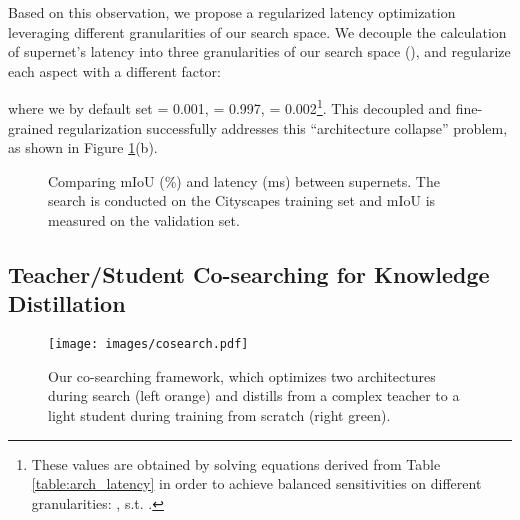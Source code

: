 \documentclass{article} \usepackage{iclr2020_conference,times}
\begin{document}
Based on this observation, we propose a regularized latency optimization leveraging different granularities of our search space. We decouple the calculation of supernet's latency into three granularities of our search space (), and regularize each aspect with a different factor:

where we by default set  = 0.001,  = 0.997,  = 0.002\footnote{These values are obtained by solving equations derived from Table \ref{table:arch_latency} in order to achieve balanced sensitivities on different granularities: , s.t. .}. This decoupled and fine-grained regularization successfully addresses this ``architecture collapse'' problem, as shown in Figure \ref{fig:search_curve}(b).


\begin{figure}[ht]
\vspace{-1em}
\begin{center}
\hfill
{} 
\vspace{-0.5em}
\caption{Comparing mIoU (\%) and latency (ms)  between supernets. The search is conducted on the Cityscapes training set and mIoU is measured on the validation set.}
\vspace{-1em}
\label{fig:search_curve}
\end{center}
\end{figure}


\subsection{Teacher/Student Co-searching for Knowledge Distillation}\label{sec:cosearch_distillation}

\begin{wrapfigure}{r}{50mm}
\vspace{-2em}
\begin{center}
\texttt{[image: images/cosearch.pdf]}
\end{center}
\vspace{-1em}
\caption{Our co-searching framework, which optimizes two architectures during search (left orange) and distills from a complex teacher to a light student during training from scratch (right green).}
\vspace{-1em}
\label{fig:cosearch}
\end{wrapfigure}
\end{document}
